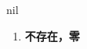 
\begin{frame}
{\huge nil}
\begin{center}
\begin{enumerate}\Large
  \item \textbf{不存在，零}
\end{enumerate}
\end{center}
\end{frame}

